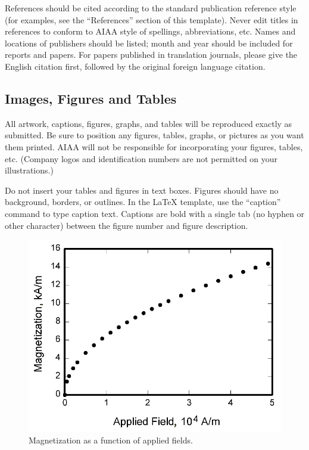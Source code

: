 \documentclass[conf]{new-aiaa}
\begin{document}
References should be cited according to the standard publication reference style (for examples, see the ``References'' section of this template). Never edit titles in references to conform to AIAA style of spellings, abbreviations, etc. Names and locations of publishers should be listed; month and year should be included for reports and papers. For papers published in translation journals, please give the English citation first, followed by the original foreign language citation.

\subsection{Images, Figures and Tables}
All artwork, captions, figures, graphs, and tables will be reproduced exactly as submitted. Be sure to position any figures, tables, graphs, or pictures as you want them printed. AIAA will not be responsible for incorporating your figures, tables, etc. (Company logos and identification numbers are not permitted on your illustrations.)

Do not insert your tables and figures in text boxes. Figures should have no background, borders, or outlines. In the \LaTeX{} template, use the ``caption'' command to type caption text. Captions are bold with a single tab (no hyphen or other character) between the figure number and figure description.



\begin{figure}[hbt!]
\centering
\includegraphics[width=.5\textwidth]{figs/graph}
\caption{Magnetization as a function of applied fields.}
\end{figure}
\end{document}
